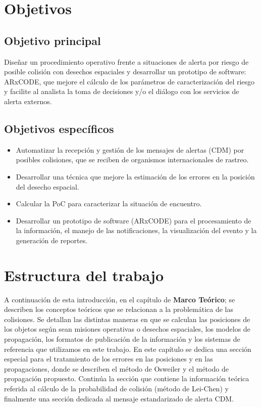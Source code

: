 \section{Objetivos}

\subsection*{Objetivo principal}
Dise\~nar un procedimiento operativo frente a situaciones de alerta por riesgo de posible
colisi\'on con desechos espaciales y desarrollar un prototipo de software: ARxCODE, que
mejore el c\'alculo de los par\'ametros de caracterizaci\'on del riesgo y facilite al analista la
toma de decisiones y/o el di\'alogo con los servicios de alerta externos.\\

\subsection*{Objetivos espec\'ificos}
\begin{itemize}
\item Automatizar la recepci\'on y gesti\'on de los mensajes de alertas (CDM) por posibles
colisiones, que se reciben de organismos internacionales de rastreo.
\item Desarrollar una t\'ecnica que mejore la estimaci\'on de los errores en la posici\'on del desecho espacial.
\item Calcular la \ac{PoC} para caracterizar la situaci\'on de encuentro.
\item Desarrollar un prototipo de software (ARxCODE) para el procesamiento de la informaci\'on, el manejo de las notificaciones, la visualizaci\'on del evento y la generaci\'on de reportes.
\end{itemize}

\section{Estructura del trabajo}

A continuaci\'on de esta introducci\'on, en el cap\'itulo de {\bf{Marco Te\'orico}}; se describen los conceptos te\'oricos que se relacionan a la problem\'atica de las colisiones. Se detallan las distintas maneras en que se calculan las posiciones de los objetos seg\'un sean misiones operativas o desechos espaciales, los modelos de propagaci\'on, los formatos de publicaci\'on de la informaci\'on y los sistemas de referencia que utilizamos en este trabajo. En este cap\'itulo se dedica una secci\'on especial para el tratamiento de los errores en las posiciones y en las propagaciones, donde se describen el m\'etodo de Osweiler y el m\'etodo de propagaci\'on propuesto. Contin\'ua la secci\'on que contiene la informaci\'on te\'orica referida al c\'alculo de la probabilidad de colisi\'on (m\'etodo de Lei-Chen) y finalmente una secci\'on dedicada al mensaje estandarizado de alerta \ac{CDM}.

